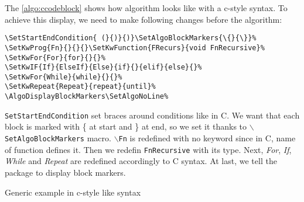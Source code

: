 \documentclass[a4paper]{article}
\begin{document}
The \autoref{algo:ccodeblock} shows how algorithm looks like with a c-style
syntax. To achieve this display, we need to make following changes before the algorithm:\vspace{-1.5ex}
\begin{verbatim}
\SetStartEndCondition{ (}{)}{)}\SetAlgoBlockMarkers{\{}{\}}%
\SetKwProg{Fn}{}{}{}\SetKwFunction{FRecurs}{void FnRecursive}%
\SetKwFor{For}{for}{}{}%
\SetKwIF{If}{ElseIf}{Else}{if}{}{elif}{else}{}%
\SetKwFor{While}{while}{}{}%
\SetKwRepeat{Repeat}{repeat}{until}%
\AlgoDisplayBlockMarkers\SetAlgoNoLine%
\end{verbatim}
\vspace{-1.5ex} \texttt{SetStartEndCondition} set braces around conditions like in C. We
want that each block is marked with \{ at start and \} at end, so we set it thanks to
\texttt{$\backslash$SetAlgoBlockMarkers} macro. \texttt{$\backslash$Fn} is redefined with
no keyword since in C, name of function defines it. Then we redefin \texttt{FnRecursive}
with its type. Next, \emph{For}, \emph{If}, \emph{While} and \emph{Repeat} are redefined
accordingly to C syntax. At last, we tell the package to display block markers.
%
\begin{algorithm}\AlgoDisplayBlockMarkers\SetAlgoNoLine%
  \SetStartEndCondition{ (}{)}{)}\SetAlgoBlockMarkers{\{}{\}}%
  \caption{Generic example in c-style like syntax}\label{algo:ccodeblock}
  
\end{algorithm}
\end{document}
